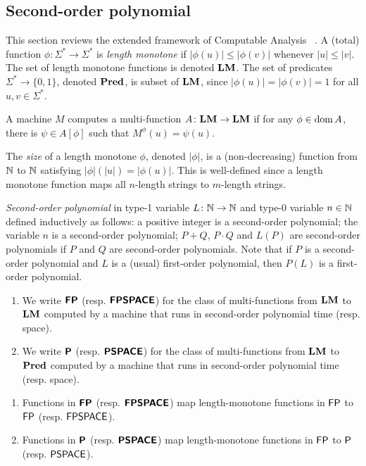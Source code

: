 \subsection{Second-order polynomial}
\label{section:TTF}

This section reviews the extended framework of Computable Analysis~%
\cite{kawamura2012complexity}.
A (total) function $\phi \colon \Sigma^* \to \Sigma^*$ is \emph{length monotone}
if  $|\phi(u)| \le |\phi(v)|$ whenever $|u| \le |v|$.
The set of length monotone functions is denoted $\mathbf{LM}$.
The set of predicates $\Sigma^* \to \{0, 1\}$, denoted $\mathbf{Pred}$, is subset of $\mathbf{LM}$, 
since $|\phi(u)| = |\phi(v)| = 1$ for all $u, v \in \Sigma^*$.

\begin{definition}
 A machine $M$ computes a multi-function $A \colon \mathbf{LM} \to \mathbf{LM}$ if for any
 $\phi \in \mathop{\rm dom} A$, there is $\psi \in A[\phi]$ such that $M^\phi(u) = \psi(u)$.
\end{definition}

The \emph{size} of a length monotone $\phi$, denoted $|\phi|$,
is a (non-decreasing) function from $\mathbb N$ to $\mathbb N$ satisfying 
$|\phi|(|u|) = |\phi(u)|$.
This is well-defined since a length monotone function maps 
all $n$-length strings to $m$-length strings.

\emph{Second-order polynomial} in type-1 variable $L \colon \mathbb N \to \mathbb N$
and type-0 variable $n \in \mathbb N$ 
defined inductively as follows:
a positive integer is a second-order polynomial;
the variable $n$ is a second-order polynomial;
$P+Q$, $P \cdot Q$ and $L(P)$ are
second-order polynomials if $P$ and $Q$ are second-order polynomials.
Note that if $P$ is a second-order polynomial and $L$ is a (usual) first-order
polynomial, then $P(L)$ is a first-order polynomial.

\begin{definition}
\begin{enumerate}
 \item We write $\text{\bfseries \sffamily \upshape FP}$ (resp. $\text{\bfseries \sffamily \upshape FPSPACE}$) for the class of
       multi-functions from $\mathbf{LM}$ to $\mathbf{LM}$ computed by a machine that runs
       in second-order polynomial time (resp. space).
 \item We write $\text{\bfseries \sffamily \upshape P}$ (resp. $\text{\bfseries \sffamily \upshape PSPACE}$) for the class of
       multi-functions from $\mathbf{LM}$ to $\mathbf{Pred}$ computed by a machine that runs
       in second-order polynomial time (resp. space).
\end{enumerate}
\end{definition}

\begin{lemma}
 \begin{enumerate}
  \item Functions in $\text{\bfseries \sffamily \upshape FP}$ (resp. $\text{\bfseries \sffamily \upshape FPSPACE}$) map 
	length-monotone functions in $\mathsf{FP}$ to $\mathsf{FP}$ 
	(resp. $\mathsf{FPSPACE}$).
  \item Functions in $\text{\bfseries \sffamily \upshape P}$ (resp. $\text{\bfseries \sffamily \upshape PSPACE}$) map 
	length-monotone functions in $\mathsf{FP}$ to $\mathsf{P}$
	(resp. $\mathsf{PSPACE}$).
 \end{enumerate}
\end{lemma}







